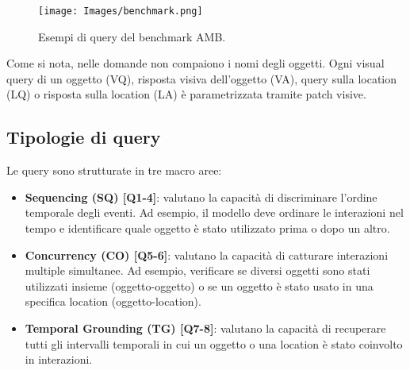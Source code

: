 \begin{figure}[ht]
    \centering
    \texttt{[image: Images/benchmark.png]}
    \caption{Esempi di query del benchmark AMB.}
    \label{fig:benchmark_queries}
\end{figure}

Come si nota, nelle domande non compaiono i nomi degli oggetti. Ogni visual query di un oggetto (VQ), risposta visiva dell'oggetto (VA), query sulla location (LQ) o risposta sulla location (LA) è parametrizzata tramite patch visive.

\subsection*{Tipologie di query}

Le query sono strutturate in tre macro aree:
\begin{itemize}
    \item \textbf{\textcolor{sqcolor}{Sequencing (SQ) [Q1-4]}}: valutano la capacità di discriminare l'ordine temporale degli eventi. Ad esempio, il modello deve ordinare le interazioni nel tempo e identificare quale oggetto è stato utilizzato prima o dopo un altro.
    
    \item \textbf{\textcolor{cocolor}{Concurrency (CO) [Q5-6]}}: valutano la capacità di catturare interazioni multiple simultanee. Ad esempio, verificare se diversi oggetti sono stati utilizzati insieme (oggetto-oggetto) o se un oggetto è stato usato in una specifica location (oggetto-location).
    
    \item \textbf{\textcolor{tgcolor}{Temporal Grounding (TG) [Q7-8]}}: valutano la capacità di recuperare tutti gli intervalli temporali in cui un oggetto o una location è stato coinvolto in interazioni.
\end{itemize}

